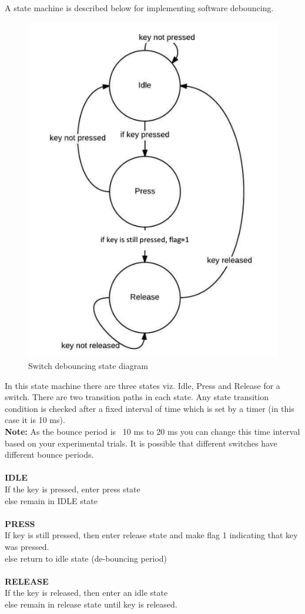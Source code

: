 \documentclass{article} %
\begin{document}
A state machine is described below for implementing software debouncing. 
\begin{figure}
\centering
\includegraphics[scale=0.8]{stateChart.png}
\caption{Switch debouncing state diagram}
\label{sm}
\end{figure}
In this state machine there are three states viz. Idle, Press and Release for a switch.
There are two transition paths in each state. Any state transition condition is checked after a fixed interval
of time which is set by a timer (in this case it is 10 ms).
\\
\textbf{Note:} As the bounce period is ~10 ms to 20 ms you can change this time interval based on your experimental
trials. It is possible that different switches have different bounce periods.
\\
\\
\textbf{IDLE} \\
If the key is pressed, enter press state\\
else remain in IDLE state
\\
\\
\textbf{PRESS} \\
If key is still pressed, then enter release state and make flag 1 indicating that key was pressed.\\
else return to idle state (de-bouncing period)
\\
\\
\textbf{RELEASE} \\
If the key is released, then enter an idle state\\
else remain in release state until key is released.
\newpage
\end{document}
